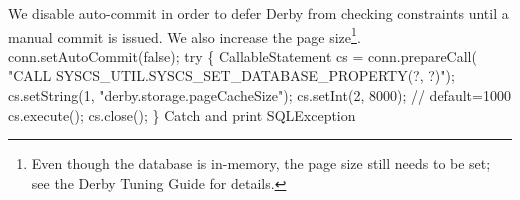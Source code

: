 \documentclass{article}
\def\nwendcode{\endtrivlist \endgroup}
\let\nwdocspar=\par
\theoremstyle{definition}
\begin{document}
We disable auto-commit in order to defer Derby from checking constraints until
a manual commit is issued. We also increase the page size\footnote{Even though the
database is in-memory, the page size still needs to be set; see the Derby
Tuning Guide for details.}.
\nwenddocs{}\endmoddef{}
conn.setAutoCommit(false);
try \{
  CallableStatement cs = conn.prepareCall(
    "CALL SYSCS_UTIL.SYSCS_SET_DATABASE_PROPERTY(?, ?)");
  cs.setString(1, "derby.storage.pageCacheSize");
  cs.setInt(2, 8000);  // default=1000
  cs.execute();
  cs.close();
\}
\LA{}Catch and print \code{}SQLException\edoc{}~{\nwtagstyle{}}\RA{}
\nwendcode{}\nwdocspar
\end{document}
